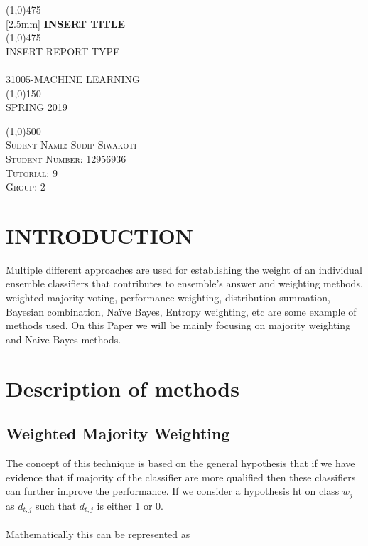 \documentclass{article}
\begin{document}
\begin{titlepage}
	\begin{center}
    \line(1,0){475}\\
   [2.5mm]
    \huge{\bfseries INSERT TITLE}\\
    \line(1,0){475}\\
    [3mm]
    \textsc{\Large INSERT REPORT TYPE}\\
    [6cm]
    \textsc{\small \\
    [1mm]
    31005-MACHINE LEARNING\\
    \line(1,0){150}\\
    SPRING 2019}\\
    [6.cm]
    \end{center}
    \begin{flushleft}
    \line(1,0){500}\\
    \textsc{\large Sudent Name: Sudip Siwakoti \\Student Number: 12956936\\ Tutorial: 9 \\ Group: 2 }
    \end{flushleft}
    \lipsum[0]
\end{titlepage}
\tableofcontents
\thispagestyle{empty}
\cleardoublepage
\setcounter{page}{1}

\section{INTRODUCTION}\label{sec:intor}


Multiple different approaches are used for establishing the weight of an individual ensemble classifiers that contributes to ensemble’s answer and weighting methods, weighted majority voting, performance weighting, distribution summation, Bayesian combination, Naïve Bayes, Entropy weighting, etc are some example of methods used. On this Paper we will be mainly focusing on majority weighting and Naive Bayes methods.
\section{Description of methods}
\subsection{Weighted Majority Weighting}\label{SEC:Methods }
The concept of this technique is based on the general hypothesis that if we have evidence that if majority of the classifier are more qualified then these classifiers can further improve the performance. If we consider a hypothesis ht on class $w_j$ as $d_{t,j}$ such that $d_{t,j}$ is either 1 or 0.\\
\\
Mathematically this can be represented as
\end{document}
